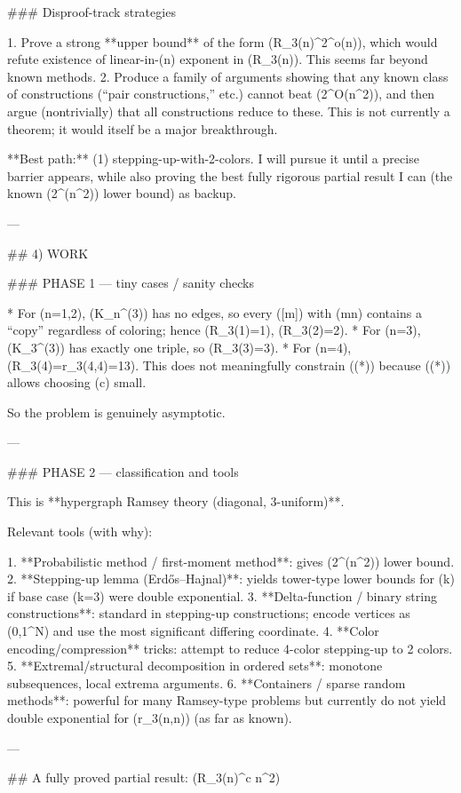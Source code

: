 ### Disproof-track strategies

1. Prove a strong **upper bound** of the form (R_3(n)^{2^{o(n)}}), which would refute existence of linear-in-(n) exponent in (\log\log R_3(n)). This seems far beyond known methods.
2. Produce a family of arguments showing that any known class of constructions (“pair constructions,” etc.) cannot beat (2^{O(n^2)}), and then argue (nontrivially) that all constructions reduce to these. This is not currently a theorem; it would itself be a major breakthrough.

**Best path:** (1) stepping-up-with-2-colors. I will pursue it until a precise barrier appears, while also proving the best fully rigorous partial result I can (the known (2^{\Omega(n^2)}) lower bound) as backup.

---

## 4) WORK

### PHASE 1 — tiny cases / sanity checks

* For (n=1,2), (K_n^{(3)}) has no edges, so every ([m]) with (m\ge n) contains a “copy” regardless of coloring; hence (R_3(1)=1), (R_3(2)=2).
* For (n=3), (K_3^{(3)}) has exactly one triple, so (R_3(3)=3).
* For (n=4), (R_3(4)=r_3(4,4)=13).
  This does not meaningfully constrain ((*)) because ((*)) allows choosing (c) small.

So the problem is genuinely asymptotic.

---

### PHASE 2 — classification and tools

This is **hypergraph Ramsey theory (diagonal, 3-uniform)**.

Relevant tools (with why):

1. **Probabilistic method / first-moment method**: gives (2^{\Omega(n^2)}) lower bound.
2. **Stepping-up lemma (Erdős–Hajnal)**: yields tower-type lower bounds for (k) if base case (k=3) were double exponential. 
3. **Delta-function / binary string constructions**: standard in stepping-up constructions; encode vertices as ({0,1}^N) and use the most significant differing coordinate.
4. **Color encoding/compression** tricks: attempt to reduce 4-color stepping-up to 2 colors.
5. **Extremal/structural decomposition in ordered sets**: monotone subsequences, local extrema arguments.
6. **Containers / sparse random methods**: powerful for many Ramsey-type problems but currently do not yield double exponential for (r_3(n,n)) (as far as known).

---

## A fully proved partial result: (R_3(n)^{c n^2})

